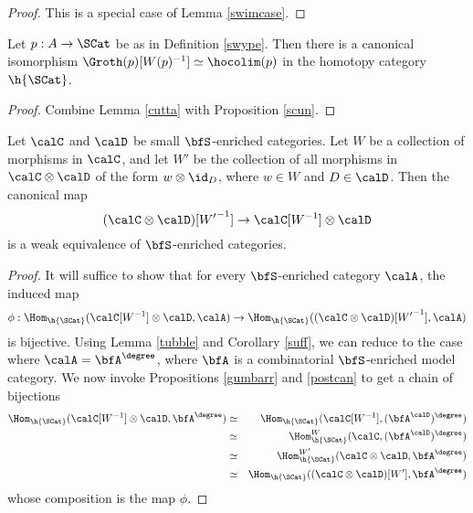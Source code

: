 \begin{Simplicial Categories}
\begin{proof}
This is a special case of Lemma \ref{swimcase}. 
\end{proof}

\begin{lemma}\label{toopa}
Let $p: A \rightarrow \SCat$ be as in Definition \ref{swype}. Then
there is a canonical isomorphism $\Groth(p)[ W(p)^{-1} ] \simeq \hocolim(p)$
in the homotopy category $\h{\SCat}$.
\end{lemma}

\begin{proof}
Combine Lemma \ref{cutta} with Proposition \ref{scun}.
\end{proof}

\begin{lemma}\label{twoface}
Let $\calC$ and $\calD$ be small $\bfS$-enriched categories.
Let $W$ be a collection of morphisms in $\calC$, and let
$W'$ be the collection of all morphisms in $\calC \otimes \calD$ of the form
$w \otimes \id_{D}$, where $w \in W$ and $D \in \calD$. Then the canonical map
$$ ( \calC \otimes \calD )[ {W'}^{-1} ] \rightarrow \calC[W^{-1}] \otimes \calD$$
is a weak equivalence of $\bfS$-enriched categories.
\end{lemma}

\begin{proof}
It will suffice to show that for every $\bfS$-enriched category $\calA$, 
the induced map
$$ \phi: \Hom_{ \h{\SCat} }( \calC[W^{-1}] \otimes \calD, \calA) \rightarrow
\Hom_{ \h{\SCat} }( ( \calC \otimes \calD)[ {W'}^{-1} ], \calA) $$
is bijective. Using Lemma \ref{tubble} and Corollary \ref{suff}, we can reduce
to the case where $\calA = \bfA^{\degree}$, where $\bfA$ is a combinatorial $\bfS$-enriched
model category. We now invoke Propositions \ref{gumbarr} and \ref{postcan} to get a chain of bijections
\begin{eqnarray*}
\Hom_{ \h{\SCat} }( \calC[W^{-1}] \otimes \calD, \bfA^{\degree}) & \simeq &
\Hom_{\h{\SCat} }( \calC[W^{-1}], ( \bfA^{\calD} )^{\degree} ) \\
& \simeq & \Hom_{\h{\SCat}}^{W}( \calC, ( \bfA^{\calD} )^{\degree} ) \\
& \simeq & \Hom_{\h{\SCat}}^{W'}( \calC \otimes \calD, \bfA^{\degree} ) \\
& \simeq & \Hom_{\h{\SCat}}( (\calC \otimes \calD)[W'], \bfA^{\degree} )
\end{eqnarray*}
whose composition is the map $\phi$.
\end{proof}


\end{Simplicial Categories}
